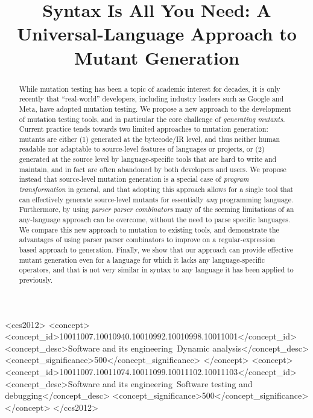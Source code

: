 \documentclass[acmsmall,screen,review,anonymous]{acmart}
\title{Syntax Is All You Need: A Universal-Language Approach to Mutant Generation}
\begin{document}

\renewcommand{\shortauthors}{Trovato et al.}

\begin{abstract}
  While mutation testing has been a topic of academic interest for
decades, it is only recently that ``real-world'' developers, including
industry leaders such as Google and Meta, have adopted mutation
testing.  We propose a new approach to the development of mutation
testing tools, and in particular the core challenge of
\emph{generating mutants}.  Current practice tends towards two
limited approaches to mutation generation: mutants are either (1)
generated at the bytecode/IR level, and thus neither human readable
nor adaptable to source-level features of languages or projects, or
(2) generated at the source level by language-specific tools that are
hard to write and maintain, and in fact are often abandoned by both
developers and users.  We propose instead that source-level mutation
generation is a special case of \emph{program transformation} in
general, and that adopting this approach allows for a single tool that
can effectively generate source-level mutants for essentially
\emph{any} programming language. Furthermore, by using \emph{parser
  parser combinators} many of the seeming limitations of an
any-language approach can be overcome, without the need to parse
specific languages.  We compare this new
approach to mutation to existing tools, and demonstrate the advantages
of using parser parser combinators to improve on a regular-expression
based approach to generation.  Finally, we show that our approach
can provide effective mutant generation even for a language for which
it lacks any language-specific operators, and that is not very similar
in syntax to any language it has been applied to previously.
\end{abstract}

\begin{CCSXML}
<ccs2012>
<concept>
<concept_id>10011007.10010940.10010992.10010998.10011001</concept_id>
<concept_desc>Software and its engineering~Dynamic analysis</concept_desc>
<concept_significance>500</concept_significance>
</concept>
<concept>
<concept_id>10011007.10011074.10011099.10011102.10011103</concept_id>
<concept_desc>Software and its engineering~Software testing and debugging</concept_desc>
<concept_significance>500</concept_significance>
</concept>
</ccs2012>
\end{CCSXML}
\end{document}
